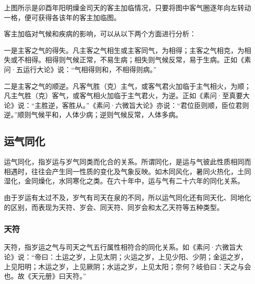 \documentclass[12pt]{ctexbook}
\begin{document}
上图所示是卯酉年阳明燥金司天的客主加临情况，只要将图中客气圈逐年向左转动一格，便可获得各该年的客主加临图。

客主加临对气候和疾病的影响，可以从以下两个方面进行分析：

一是主客之气的得失。凡主客之气相生或主客同气，为相得；主客之气相克，为相失或不相得。相得则气候正常，不易生病；相失则气候反常，易于生病。正如《素问·五运行大论》说：“气相得则和，不相得则病。”

二是主客之气的顺逆。凡客气胜（克）主气，或客气君火加临于主气相火，为顺；凡主气胜（克）客气，或客气相火加临于主气君火，为逆。正如《素问·至真要大论》说：“主胜逆，客胜从。”《素问·六微旨大论》亦说：“君位臣则顺，臣位君则逆。”顺则气候平和，人体少病；逆则气候反常，人体多病。

\subsection{运气同化}%

运气同化，指岁运与岁气同类而化合的关系。所谓同化，是运与气彼此性质相同而相遇时，往往会产生同一性质的变化及气象反映。如木同风化，暑同火热化，土同湿化，金同燥化，水同寒化之类。在六十年中，运与气有二十六年的同化关系。

由于岁运有太过不及，岁气有司天在泉的不同，所以运气同化还有同天化、同地化的区别，而表现为天符、岁会、同天符、同岁会和太乙天符等五种类型。

\subsubsection{天符}%

天符，指岁运之气与司天之气五行属性相符合的同化关系。如《素问·六微旨大论》说：“帝曰：土运之岁，上见太阴；火运之岁，上见少阳、少阴；金运之岁，上见阳明；木运之岁，上见厥阴；水运之岁，上见太阳；奈何？岐伯曰：天之与会也。故《天元册》曰天符。”
\end{document}
